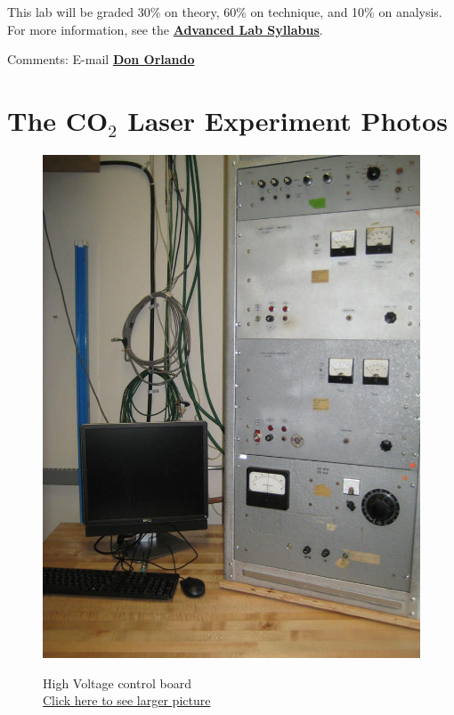 \documentclass{../lab}
\begin{document}
This lab will be graded 30\% on theory, 60\% on technique, and 10\% on analysis. For more information, see the \href{\AdvancedLabSyllabus}{\textbf{Advanced Lab Syllabus}}.

Comments: E-mail \href{\MailDonOrlando}{\textbf{Don Orlando}}

\section{The CO\texorpdfstring{$_2$}{2} Laser Experiment Photos}

\begin{figure}[H]
  \href{http://experimentationlab.berkeley.edu/sites/default/files/CO-2/CO2__4082B.jpg}{\includegraphics[width=\linewidth,keepaspectratio]{images/CO2__4082B.jpg}}
  \caption{High Voltage control board \\ \href{http://experimentationlab.berkeley.edu/sites/default/files/CO-2/CO2__4082B.jpg}{Click here to see larger picture}}

\end{figure}
\end{document}
